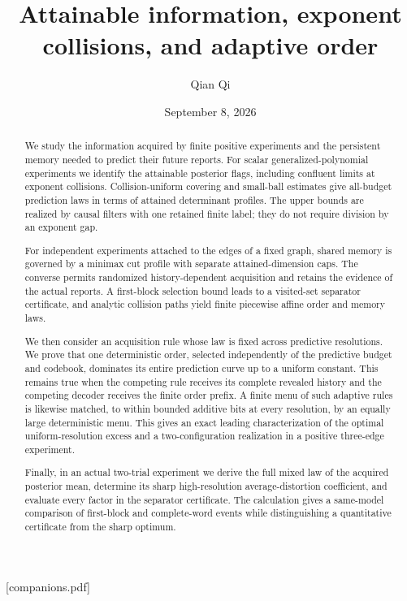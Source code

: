 \makeatletter
{}
\makeatother

[companions.pdf]
\title[Attainable information and adaptive order]{Attainable information, exponent collisions, and adaptive order}
\author{Qian Qi}
\date{September 8, 2026}

\begin{abstract}
We study the information acquired by finite positive experiments and the persistent memory needed to predict their future reports. For scalar generalized-polynomial experiments we identify the attainable posterior flags, including confluent limits at exponent collisions. Collision-uniform covering and small-ball estimates give all-budget prediction laws in terms of attained determinant profiles. The upper bounds are realized by causal filters with one retained finite label; they do not require division by an exponent gap.

For independent experiments attached to the edges of a fixed graph, shared memory is governed by a minimax cut profile with separate attained-dimension caps. The converse permits randomized history-dependent acquisition and retains the evidence of the actual reports. A first-block selection bound leads to a visited-set separator certificate, and analytic collision paths yield finite piecewise affine order and memory laws.

We then consider an acquisition rule whose law is fixed across predictive resolutions. We prove that one deterministic order, selected independently of the predictive budget and codebook, dominates its entire prediction curve up to a uniform constant. This remains true when the competing rule receives its complete revealed history and the competing decoder receives the finite order prefix. A finite menu of such adaptive rules is likewise matched, to within bounded additive bits at every resolution, by an equally large deterministic menu. This gives an exact leading characterization of the optimal uniform-resolution excess and a two-configuration realization in a positive three-edge experiment.

Finally, in an actual two-trial experiment we derive the full mixed law of the acquired posterior mean, determine its sharp high-resolution average-distortion coefficient, and evaluate every factor in the separator certificate. The calculation gives a same-model comparison of first-block and complete-word events while distinguishing a quantitative certificate from the sharp optimum.
\end{abstract}
\maketitle

